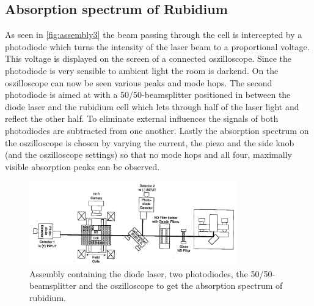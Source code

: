 \subsection{Absorption spectrum of Rubidium}
\label{sec:absorption}
As seen in \autoref{fig:assembly3} the beam passing through the cell is intercepted by a photodiode which turns the intensity of the laser beam to a proportional voltage.
This voltage is displayed on the screen of a connected oszilloscope.
Since the photodiode is very sensible to ambient light the room is darkend.
On the oszilloscope can now be seen various peaks and mode hops.
The second photodiode is aimed at with a 50/50-beamsplitter positioned in between the diode laser and the rubidium cell which lets through half of the laser light and reflect the other half.
To eliminate external influences the signals of both photodiodes are subtracted from one another.
Lastly the absorption spectrum on the oszilloscope is chosen by varying the current, the piezo and the side knob (and the oszilloscope settings) so that no mode hops and all four, maximally visible absorption peaks can be observed.
\begin{figure}
    \center
    \includegraphics[width=0.8\textwidth]{bilder/Assembly_3.png}
    \caption{Assembly containing the diode laser, two photodiodes, the 50/50-beamsplitter and the oszilloscope to get the absorption spectrum of rubidium. \cite{anleitung}}
    \label{fig:assembly3}
\end{figure}

\FloatBarrier
